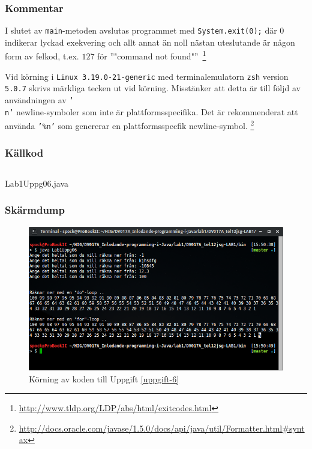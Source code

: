 \subsubsection{Kommentar}
\par I slutet av \texttt{main}-metoden avslutas programmet med
\texttt{System.exit(0);} där $0$ indikerar lyckad exekvering och allt annat än
noll nästan uteslutande är någon form av felkod, t.ex. $127$ för ''"command not found"''\ 
\footnote{\url{http://www.tldp.org/LDP/abs/html/exitcodes.html}}

\par Vid körning i \texttt{Linux 3.19.0-21-generic} med terminalemulatorn \texttt{zsh} version \texttt{5.0.7} skrivs
märkliga tecken ut vid körning. Misstänker att detta är till följd av användningen av \texttt{'\\n'} newline-symboler som inte är plattformsspecifika. Det är rekommenderat
att använda \texttt{'\%n'} som genererar en plattformsspecfik newline-symbol.
\footnote{\url{http://docs.oracle.com/javase/1.5.0/docs/api/java/util/Formatter.html#syntax}}


\subsubsection{Källkod}\label{uppgift-6_src}
    \inputminted[linenos]{java}{src/Lab1Uppg06.java}
    \caption{Lab1Uppg06.java}
    \label{Uppg6src}

\subsubsection{Skärmdump}
\begin{figure}[htbp]
    \centering
        \includegraphics[width=\linewidth]{img/06.png}
    \caption{Körning av koden till Uppgift \ref{uppgift-6}}
    \label{fig:screenshot-06}
\end{figure}
